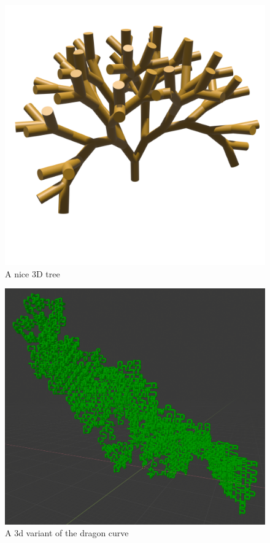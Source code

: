 \begin{figure}[h]
    \centering
    \includegraphics[width=\textwidth]{figures/L-systems/tree1.png}
    \caption{A nice 3D tree}
\end{figure}

\begin{figure}[h]
    \centering
    \includegraphics[width=\textwidth]{figures/L-systems/dragon0-3d.png}
    \caption{A 3d variant of the dragon curve}
\end{figure}


